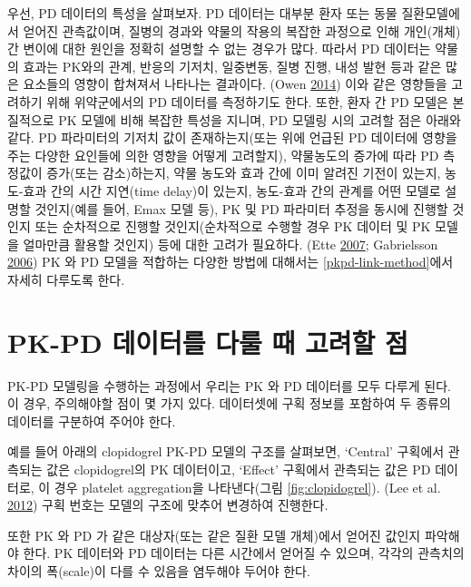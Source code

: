 \documentclass[
  11pt,
  krantz2, a4paper, twoside]{krantz}
\theoremstyle{definition}
\theoremstyle{definition}
\theoremstyle{definition}
\theoremstyle{remark}
\begin{document}
우선, PD 데이터의 특성을 살펴보자. PD 데이터는 대부분 환자 또는 동물 질환모델에서 얻어진 관측값이며, 질병의 경과와 약물의 작용의 복잡한 과정으로 인해 개인(개체) 간 변이에 대한 원인을 정확히 설명할 수 없는 경우가 많다. 따라서 PD 데이터는 약물의 효과는 PK와의 관계, 반응의 기저치, 일중변동, 질병 진행, 내성 발현 등과 같은 많은 요소들의 영향이 합쳐져서 나타나는 결과이다. (Owen \protect\hyperlink{ref-kelly}{2014}) 이와 같은 영향들을 고려하기 위해 위약군에서의 PD 데이터를 측정하기도 한다. 또한, 환자 간 PD 모델은 본질적으로 PK 모델에 비해 복잡한 특성을 지니며, PD 모델링 시의 고려할 점은 아래와 같다. PD 파라미터의 기저치 값이 존재하는지(또는 위에 언급된 PD 데이터에 영향을 주는 다양한 요인들에 의한 영향을 어떻게 고려할지), 약물농도의 증가에 따라 PD 측정값이 증가(또는 감소)하는지, 약물 농도와 효과 간에 이미 알려진 기전이 있는지, 농도-효과 간의 시간 지연(time delay)이 있는지, 농도-효과 간의 관계를 어떤 모델로 설명할 것인지(예를 들어, Emax 모델 등), PK 및 PD 파라미터 추정을 동시에 진행할 것인지 또는 순차적으로 진행할 것인지(순차적으로 수행할 경우 PK 데이터 및 PK 모델을 얼마만큼 활용할 것인지) 등에 대한 고려가 필요하다. (Ette \protect\hyperlink{ref-ette}{2007}; Gabrielsson \protect\hyperlink{ref-gabrielsson}{2006}) PK 와 PD 모델을 적합하는 다양한 방법에 대해서는 \ref{pkpd-link-method}에서 자세히 다루도록 한다.

\hypertarget{pk-pd-uxb370uxc774uxd130uxb97c-uxb2e4uxb8f0-uxb54c-uxace0uxb824uxd560-uxc810}{%
\section{PK-PD 데이터를 다룰 때 고려할 점}\label{pk-pd-uxb370uxc774uxd130uxb97c-uxb2e4uxb8f0-uxb54c-uxace0uxb824uxd560-uxc810}}

PK-PD 모델링을 수행하는 과정에서 우리는 PK 와 PD 데이터를 모두 다루게 된다. 이 경우, 주의해야할 점이 몇 가지 있다. 데이터셋에 구획 정보를 포함하여 두 종류의 데이터를 구분하여 주어야 한다.

예를 들어 아래의 clopidogrel PK-PD 모델의 구조를 살펴보면, `Central' 구획에서 관측되는 값은 clopidogrel의 PK 데이터이고, `Effect' 구획에서 관측되는 값은 PD 데이터로, 이 경우 platelet aggregation을 나타낸다(그림 \ref{fig:clopidogrel}). (Lee et al. \protect\hyperlink{ref-lee2012population}{2012}) 구획 번호는 모델의 구조에 맞추어 변경하여 진행한다.

또한 PK 와 PD 가 같은 대상자(또는 같은 질환 모델 개체)에서 얻어진 값인지 파악해야 한다. PK 데이터와 PD 데이터는 다른 시간에서 얻어질 수 있으며, 각각의 관측치의 차이의 폭(scale)이 다를 수 있음을 염두해야 두어야 한다.
\end{document}

